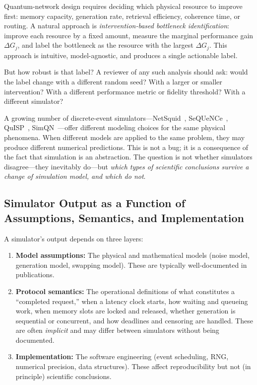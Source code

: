 \documentclass[aps,prapplied,reprint,superscriptaddress]{revtex4-2}
\newcommand{\DG}{\Delta G}
\begin{document}
Quantum-network design requires deciding which physical resource to improve first: memory capacity, generation rate, retrieval efficiency, coherence time, or routing. A natural approach is \emph{intervention-based bottleneck identification}: improve each resource by a fixed amount, measure the marginal performance gain $\DG_j$, and label the bottleneck as the resource with the largest $\DG_j$. This approach is intuitive, model-agnostic, and produces a single actionable label.

But how robust is that label? A reviewer of any such analysis should ask: would the label change with a different random seed? With a larger or smaller intervention? With a different performance metric or fidelity threshold? With a different simulator?

A growing number of discrete-event simulators---NetSquid~\cite{coopmans2021netsquid}, SeQUeNCe~\cite{wu2021sequence}, QuISP~\cite{satoh2022quisp}, SimQN~\cite{chen2023simqn}---offer different modeling choices for the same physical phenomena. When different models are applied to the same problem, they may produce different numerical predictions. This is not a bug; it is a consequence of the fact that simulation is an abstraction. The question is not whether simulators disagree---they inevitably do---but \emph{which types of scientific conclusions survive a change of simulation model, and which do not}.

\subsection{Simulator Output as a Function of Assumptions, Semantics, and Implementation}

A simulator's output depends on three layers:

\begin{enumerate}[leftmargin=2em]
\item \textbf{Model assumptions:} The physical and mathematical models (noise model, generation model, swapping model). These are typically well-documented in publications.
\item \textbf{Protocol semantics:} The operational definitions of what constitutes a ``completed request,'' when a latency clock starts, how waiting and queueing work, when memory slots are locked and released, whether generation is sequential or concurrent, and how deadlines and censoring are handled. These are often \emph{implicit} and may differ between simulators without being documented.
\item \textbf{Implementation:} The software engineering (event scheduling, RNG, numerical precision, data structures). These affect reproducibility but not (in principle) scientific conclusions.
\end{enumerate}
\end{document}
